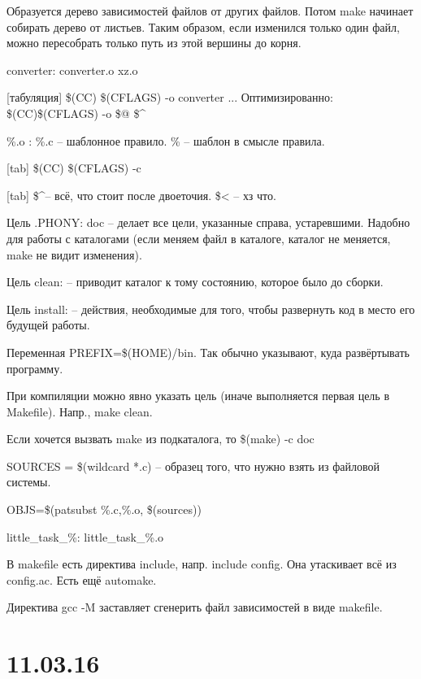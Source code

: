\documentclass[a4paper,10pt]{article}
\newcommand{\tac}{\textasciicircum}
\begin{document}
Образуется дерево зависимостей файлов от других файлов. Потом make начинает собирать дерево от листьев. Таким образом, если изменился только один файл, можно пересобрать только путь из этой вершины до корня.

converter: converter.o xz.o

[табуляция]	\$(CC) \$(CFLAGS) -o converter ... 
Оптимизированно: \$(CC)\$(CFLAGS) -o \$@ \$\tac

\%.o : \%.c -- шаблонное правило. \% -- шаблон в смысле правила.

[tab] \$(CC) \$(CFLAGS) -c 

[tab] \$\tac -- всё, что стоит после двоеточия. \$< -- хз что.

Цель .PHONY: doc -- делает все цели, указанные справа, устаревшими. Надобно для работы с каталогами (если меняем файл в каталоге, каталог не меняется, make не видит изменения).

Цель clean: -- приводит каталог к тому состоянию, которое было до сборки.

Цель install: -- действия, необходимые для того, чтобы развернуть код в место его будущей работы.

Переменная PREFIX=\$(HOME)/bin. Так обычно указывают, куда развёртывать программу.

При компиляции можно явно указать цель (иначе выполняется первая цель в Makefile). Напр., make clean.

Если хочется вызвать make из подкаталога, то \$(make) -c doc 

SOURCES = \$(wildcard *.c) -- образец того, что нужно взять из файловой системы.

OBJS=\$(patsubst \%.c,\%.o, \$(sources))

little\_task\_\%: little\_task\_\%.o

В makefile есть директива include, напр. include config. Она утаскивает всё из config.ac. Есть ещё automake.

Директива gcc -M заставляет сгенерить файл зависимостей в виде makefile.

\section{11.03.16}
\end{document}
